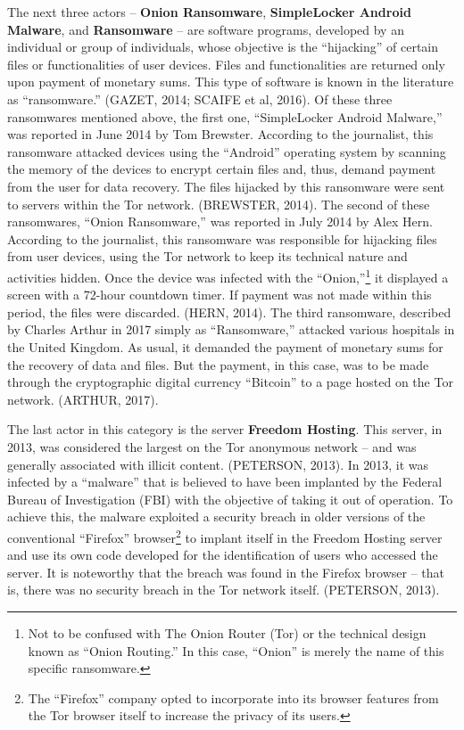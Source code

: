 The next three actors -- \textbf{Onion Ransomware}, \textbf{SimpleLocker Android Malware}, and \textbf{Ransomware} -- are software programs, developed by an individual or group of individuals, whose objective is the ``hijacking'' of certain files or functionalities of user devices. Files and functionalities are returned only upon payment of monetary sums. This type of software is known in the literature as ``ransomware.'' (GAZET, 2014; SCAIFE et al, 2016). Of these three ransomwares mentioned above, the first one, ``SimpleLocker Android Malware,'' was reported in June 2014 by Tom Brewster. According to the journalist, this ransomware attacked devices using the ``Android'' operating system by scanning the memory of the devices to encrypt certain files and, thus, demand payment from the user for data recovery. The files hijacked by this ransomware were sent to servers within the Tor network. (BREWSTER, 2014). The second of these ransomwares, ``Onion Ransomware,'' was reported in July 2014 by Alex Hern. According to the journalist, this ransomware was responsible for hijacking files from user devices, using the Tor network to keep its technical nature and activities hidden. Once the device was infected with the ``Onion,''\footnote{Not to be confused with The Onion Router (Tor) or the technical design known as ``Onion Routing.'' In this case, ``Onion'' is merely the name of this specific ransomware.} it displayed a screen with a 72-hour countdown timer. If payment was not made within this period, the files were discarded. (HERN, 2014). The third ransomware, described by Charles Arthur in 2017 simply as ``Ransomware,'' attacked various hospitals in the United Kingdom. As usual, it demanded the payment of monetary sums for the recovery of data and files. But the payment, in this case, was to be made through the cryptographic digital currency ``Bitcoin'' to a page hosted on the Tor network. (ARTHUR, 2017).

The last actor in this category is the server \textbf{Freedom Hosting}. This server, in 2013, was considered the largest on the Tor anonymous network -- and was generally associated with illicit content. (PETERSON, 2013). In 2013, it was infected by a ``malware'' that is believed to have been implanted by the Federal Bureau of Investigation (FBI) with the objective of taking it out of operation. To achieve this, the malware exploited a security breach in older versions of the conventional ``Firefox'' browser\footnote{The ``Firefox'' company opted to incorporate into its browser features from the Tor browser itself to increase the privacy of its users.} to implant itself in the Freedom Hosting server and use its own code developed for the identification of users who accessed the server. It is noteworthy that the breach was found in the Firefox browser -- that is, there was no security breach in the Tor network itself. (PETERSON, 2013).

